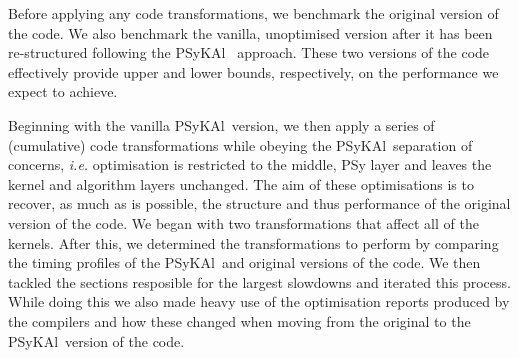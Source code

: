 \documentclass{IOS-Book-Article}
\newcommand{\psykal}{{PS}y{KA}l\ }
\begin{document}
Before applying any code transformations, we benchmark the original
version of the code. We also benchmark the vanilla, unoptimised
version after it has been re-structured following the \psykal
approach. These two versions of the code effectively provide upper and
lower bounds, respectively, on the performance we expect to achieve.

Beginning with the vanilla \psykal version, we then apply a series of
(cumulative) code transformations while obeying the \psykal separation
of concerns, {\it i.e.} optimisation is restricted to the middle,
{PS}y layer and leaves the kernel and algorithm layers unchanged. The
aim of these optimisations is to recover, as much as is possible, the
structure and thus performance of the original version of the code. We
began with two transformations that affect all of the kernels. After
this, we determined the transformations to perform by comparing the
timing profiles of the \psykal and original versions of the code. We
then tackled the sections resposible for the largest slowdowns and
iterated this process. While doing this we also made heavy use of the
optimisation reports produced by the compilers and how these changed
when moving from the original to the \psykal version of the code.
\end{document}
